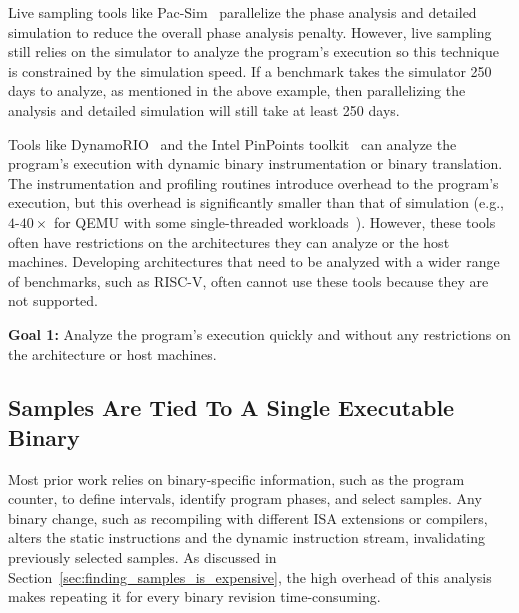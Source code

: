 Live sampling tools like Pac-Sim~\cite{pacsim} parallelize the phase analysis and detailed simulation to reduce the overall phase analysis penalty.
However, live sampling still relies on the simulator to analyze the program's execution so this technique is constrained by the simulation speed.
If a benchmark takes the simulator 250 days to analyze, as mentioned in the above example, then parallelizing the analysis and detailed simulation will still take at least 250 days.

Tools like DynamoRIO~\cite{dynamorio} and the Intel PinPoints toolkit~\cite{pinpoints} can analyze the program's execution with dynamic binary instrumentation or binary translation.
The instrumentation and profiling routines introduce overhead to the program's execution, but this overhead is significantly smaller than that of simulation (e.g., $4\text{-}40\times$ for QEMU with some single-threaded workloads~\cite{dynamicBinaryInstrumentationForBBVGeneration}).
However, these tools often have restrictions on the architectures they can analyze or the host machines.
Developing architectures that need to be analyzed with a wider range of benchmarks, such as RISC-V, often cannot use these tools because they are not supported.

\begin{tcolorbox}
\textbf{Goal 1:}
Analyze the program's execution quickly and without any restrictions on the architecture or host machines.
\end{tcolorbox}

\subsection{Samples Are Tied To A Single Executable Binary}\label{sec:samples_dont_generalize}

Most prior work relies on binary-specific information, such as the program counter, to define intervals, identify program phases, and select samples.
Any binary change, such as recompiling with different ISA extensions or compilers, alters the static instructions and the dynamic instruction stream, invalidating previously selected samples.
As discussed in Section~\ref{sec:finding_samples_is_expensive}, the high overhead of this analysis makes repeating it for every binary revision time-consuming.


